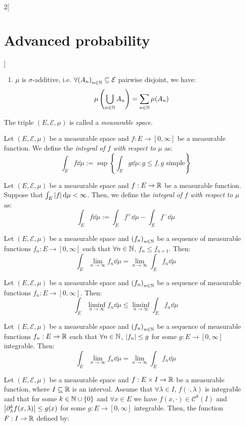 \documentclass[../../../main_math.tex]{subfiles}
\begin{document}
\begin{multicols}{2}[\section{Advanced probability}]
\begin{definition}[Measure]
\begin{enumerate}
      \item $\mu$ is $\sigma$-additive, i.e. $\forall {(A_n)}_{n\in\mathbb{N}}\subseteq \mathcal{E}$ pairwise disjoint, we have:
            $$
              \mu\left(\bigcup_{n\in\mathbb{N}}{A_n}\right)=\sum_{n\in\mathbb{N}}{\mu(A_n)}
            $$
    \end{enumerate}
    The triple $(E,\mathcal{E},\mu)$ is called a \emph{measurable space}.
  \end{definition}
  \begin{definition}
    Let $(E,\mathcal{E},\mu)$ be a measurable space and $f:E\to [0,\infty]$ be a measurable function. We define the \emph{integral of $f$ with respect to $\mu$} as:
    $$
      \int_E{f\dd{\mu}}:=\sup\left\{\int_E{g\dd{\mu}}:g\leq f, g\text{ simple}\right\}
    $$
  \end{definition}
  \begin{definition}
    Let $(E,\mathcal{E},\mu)$ be a measurable space and $f:E\to \mathbb{R}$ be a measurable function. Suppose that $\int_E{\abs{f}\dd{\mu}}<\infty$. Then, we define the \emph{integral of $f$ with respect to $\mu$} as:
    $$
      \int_E{f\dd{\mu}}:=\int_E{f^+\dd{\mu}}-\int_E{f^-\dd{\mu}}
    $$
  \end{definition}
  \begin{theorem}
    Let $(E,\mathcal{E},\mu)$ be a measurable space and ${(f_n)}_{n\in\mathbb{N}}$ be a sequence of measurable functions $f_n:E\to [0,\infty]$ such that $\forall n\in\mathbb{N}$, $f_n\leq f_{n+1}$. Then:
    $$
      \int_E{\lim_{n\to\infty}{f_n}\dd{\mu}}=\lim_{n\to\infty}{\int_E{f_n\dd{\mu}}}
    $$
  \end{theorem}
  \begin{theorem}
    Let $(E,\mathcal{E},\mu)$ be a measurable space and ${(f_n)}_{n\in\mathbb{N}}$ be a sequence of measurable functions $f_n:E\to [0,\infty]$. Then:
    $$
      \int_E{\liminf_{n\to\infty}{f_n}\dd{\mu}}\leq \liminf_{n\to\infty}{\int_E{f_n\dd{\mu}}}
    $$
  \end{theorem}
  \begin{theorem}
    Let $(E,\mathcal{E},\mu)$ be a measurable space and ${(f_n)}_{n\in\mathbb{N}}$ be a sequence of measurable functions $f_n:E\to \mathbb{R}$ such that $\forall n\in\mathbb{N}$, $\abs{f_n}\leq g$ for some $g:E\to [0,\infty]$ integrable. Then:
    $$
      \int_E{\lim_{n\to\infty}{f_n}\dd{\mu}}=\lim_{n\to\infty}{\int_E{f_n\dd{\mu}}}
    $$
  \end{theorem}
  \begin{proposition}
    Let $(E,\mathcal{E},\mu)$ be a measurable space and $f:E\times I\rightarrow \mathbb{R}$ be a measurable function, where $I\subseteq \mathbb{R}$ is an interval. Assume that $\forall \lambda\in I$, $f(\cdot,\lambda)$ is integrable and that for some $k\in \mathbb{N}\cup\{0\}$ and $\forall x\in E$ we have $f(x,\cdot)\in \mathcal{C}^k(I)$ and $\abs{\partial_\lambda^k f(x,\lambda)}\leq g(x)$ for some $g:E\to [0,\infty]$ integrable. Then, the function $F:I\to \mathbb{R}$ defined by:

\end{proposition}
\end{multicols}
\end{document}
